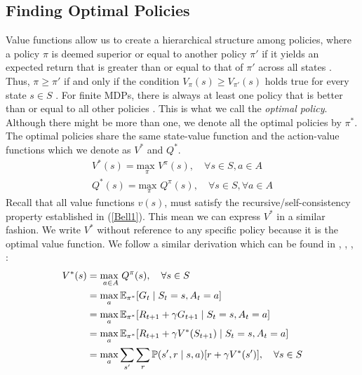 \subsection{Finding Optimal Policies}
Value functions allow us to create a hierarchical structure among policies, where a policy $\pi$ is deemed superior or equal to another policy $\pi'$ if it yields an expected return that is greater than or equal to that of $\pi'$ across all states \cite{RL2}. Thus, $\pi \geq \pi'$ if and only if the condition $V_\pi(s) \geq V_{\pi'}(s)$ holds true for every state $s \in S$ \cite{mohri2018}. For finite MDPs, there is always at least one policy that is better than or equal to all other policies \cite{RL}. This is what we call the \textit{optimal policy}. Although there might be more than one, we denote all the optimal policies by $\pi^*$. The optimal policies share the same state-value function and the action-value functions which we denote as $V^{*}$ and $Q^{*}$\cite{RL2}.
\begin{align*}
    V^{*}(s) = \underset{\pi}{\text{max }} V^{\pi}(s), \quad  \forall s \in S, a \in A \\ 
    Q^{*}(s) = \underset{\pi}{\text{max }} Q^{\pi}(s), \quad  \forall s \in S, \forall a \in A
\end{align*}
Recall that all value functions $v(s)$, must satisfy the recursive/self-consistency property established in (\ref{Bell1}). This mean we can express $V^*$ in a similar fashion. We write $V^*$ without  reference to any specific policy because it is the optimal value function. We follow a similar derivation which can be found in \cite{RL}, \cite{Markov}, \cite{RL2}, \cite{mohri2018}:
\begin{align}
    V^*(s) &= \underset{a \in A}{\text{max }} Q^{\pi}(s), \quad  \forall s \in S  \nonumber \\   
    &= \max_{a} \mathbb{E}_{\pi^*}[G_t \mid S_t = s, A_t = a] \nonumber \\
    &= \max_{a} \mathbb{E}_{\pi^*}[R_{t+1} + \gamma G_{t+1} \mid S_t = s, A_t = a] \nonumber \\
    &= \max_{a}  \mathbb{E}_{\pi^*}[R_{t+1} + \gamma V^*(S_{t+1}) \mid S_t = s, A_t = a] \nonumber \\
    &= \max_{a} \sum_{s'} \sum_{r} \mathbb P(s',r \mid s,a) [r + \gamma V^{*}(s') ], \quad \forall s \in S 
\end{align}
